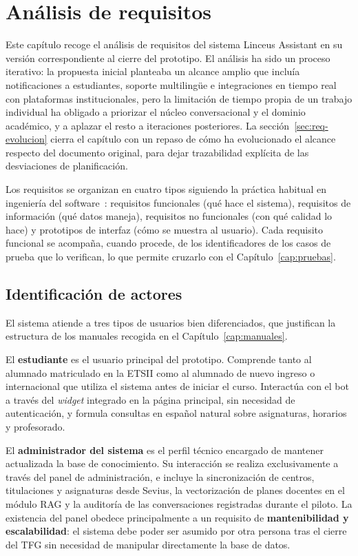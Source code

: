 
\chapter{Análisis de requisitos}\label{cap:requisitos}

Este capítulo recoge el análisis de requisitos del sistema Linceus Assistant en su versión correspondiente al cierre del prototipo. El análisis ha sido un proceso iterativo: la propuesta inicial planteaba un alcance amplio que incluía notificaciones a estudiantes, soporte multilingüe e integraciones en tiempo real con plataformas institucionales, pero la limitación de tiempo propia de un trabajo individual ha obligado a priorizar el núcleo conversacional y el dominio académico, y a aplazar el resto a iteraciones posteriores. La sección~\ref{sec:req-evolucion} cierra el capítulo con un repaso de cómo ha evolucionado el alcance respecto del documento original, para dejar trazabilidad explícita de las desviaciones de planificación.

Los requisitos se organizan en cuatro tipos siguiendo la práctica habitual en ingeniería del software~\cite{sommerville2015}: requisitos funcionales (qué hace el sistema), requisitos de información (qué datos maneja), requisitos no funcionales (con qué calidad lo hace) y prototipos de interfaz (cómo se muestra al usuario). Cada requisito funcional se acompaña, cuando procede, de los identificadores de los casos de prueba que lo verifican, lo que permite cruzarlo con el Capítulo~\ref{cap:pruebas}.

\section{Identificación de actores}\label{sec:req-actores}

El sistema atiende a tres tipos de usuarios bien diferenciados, que justifican la estructura de los manuales recogida en el Capítulo~\ref{cap:manuales}.

El \textbf{estudiante} es el usuario principal del prototipo. Comprende tanto al alumnado matriculado en la ETSII como al alumnado de nuevo ingreso o internacional que utiliza el sistema antes de iniciar el curso. Interactúa con el bot a través del \textit{widget} integrado en la página principal, sin necesidad de autenticación, y formula consultas en español natural sobre asignaturas, horarios y profesorado.

El \textbf{administrador del sistema} es el perfil técnico encargado de mantener actualizada la base de conocimiento. Su interacción se realiza exclusivamente a través del panel de administración, e incluye la sincronización de centros, titulaciones y asignaturas desde Sevius, la vectorización de planes docentes en el módulo RAG y la auditoría de las conversaciones registradas durante el piloto. La existencia del panel obedece principalmente a un requisito de \textbf{mantenibilidad y escalabilidad}: el sistema debe poder ser asumido por otra persona tras el cierre del TFG sin necesidad de manipular directamente la base de datos.

